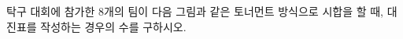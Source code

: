 \hspace*{2mm}\begin{minipage}[t]{\dimexpr\linewidth-2mm\relax}\vspace{0pt}
탁구 대회에 참가한 $8$개의 팀이 다음 그림과 같은 토너먼트 방식으로 시합을 할 때, 대진표를 작성하는 경우의 수를 구하시오.
\par\smallskip\begin{center}\resizebox{\ifdim\width>\linewidth\linewidth\else\width\fi}{!}{}\end{center}\end{minipage}
